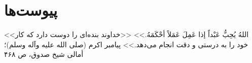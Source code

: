 \chapter*{پیوست‌ها}
\label{atch}
\bottomquote
{<<اللهُ یُحِبُّ عَبْداً إذا عَمِلَ عَمَلاً أحْکَمَهُ.>>}
{<<خداوند بنده‌ای را دوست دارد که کار خود را به درستی و دقت انجام می‌دهد.>>}
{پیامبر اكرم (صلی الله علیه وآله وسلم)؛ أمالی شیخ صدوق، ص ۴۶۸}
\clearpage
%
%
